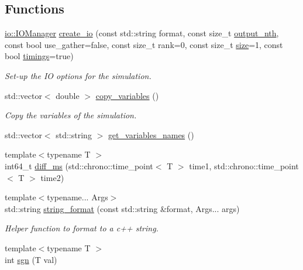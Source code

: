 \subsection*{Functions}
\begin{DoxyCompactItemize}
\item 
\mbox{\hyperlink{classwash_1_1io_1_1IOManager}{io\+::\+I\+O\+Manager}} \mbox{\hyperlink{namespacewash_a92e4e768dbd609eba32fc0d68977d42f}{create\+\_\+io}} (const std\+::string format, const size\+\_\+t \mbox{\hyperlink{namespacewash_a7b6eb3e63a02fcbd9fafd59e34fbd320}{output\+\_\+nth}}, const bool use\+\_\+gather=false, const size\+\_\+t rank=0, const size\+\_\+t \mbox{\hyperlink{consts_8cpp_ae8542fe44413919dee9f41ede5a5032d}{size}}=1, const bool \mbox{\hyperlink{namespacewash_a40aed5edcd0e0403841e3f83eaa41965}{timings}}=true)
\begin{DoxyCompactList}\small\item\em Set-\/up the IO options for the simulation. \end{DoxyCompactList}\item 
std\+::vector$<$ double $>$ \mbox{\hyperlink{namespacewash_afb1cc65bb4ecf6112723b4fb95450c96}{copy\+\_\+variables}} ()
\begin{DoxyCompactList}\small\item\em Copy the variables of the simulation. \end{DoxyCompactList}\item 
std\+::vector$<$ std\+::string $>$ \mbox{\hyperlink{namespacewash_aebd88baa23220ce7842c503157c0bb71}{get\+\_\+variables\+\_\+names}} ()
\item 
{\footnotesize template$<$typename T $>$ }\\int64\+\_\+t \mbox{\hyperlink{namespacewash_a1c8fa60f6e44bc34cd82b152c9570603}{diff\+\_\+ms}} (std\+::chrono\+::time\+\_\+point$<$ T $>$ time1, std\+::chrono\+::time\+\_\+point$<$ T $>$ time2)
\item 
{\footnotesize template$<$typename... Args$>$ }\\std\+::string \mbox{\hyperlink{namespacewash_a3c692ea6f1cb04614c790fd4b9dc34ba}{string\+\_\+format}} (const std\+::string \&format, Args... args)
\begin{DoxyCompactList}\small\item\em Helper function to format to a c++ string. \end{DoxyCompactList}\item 
{\footnotesize template$<$typename T $>$ }\\int \mbox{\hyperlink{namespacewash_a706d6d30508a81b6b9f25494cd759dff}{sgn}} (T val)

\end{DoxyCompactItemize}
